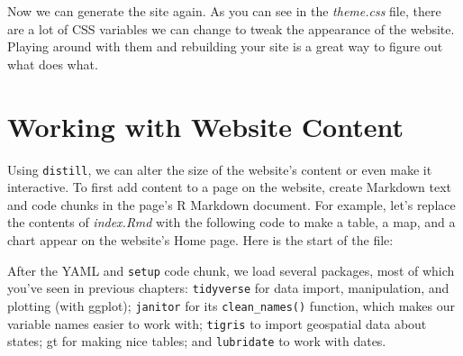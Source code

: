 \documentclass[
]{book}
\newenvironment{Shaded}{\begin{snugshade}}{\end{snugshade}}
\newcommand{\AnnotationTok}[1]{\textcolor[rgb]{0.56,0.35,0.01}{\textbf{\textit{#1}}}}
\newcommand{\CommentTok}[1]{\textcolor[rgb]{0.56,0.35,0.01}{\textit{#1}}}
\newcommand{\InformationTok}[1]{\textcolor[rgb]{0.56,0.35,0.01}{\textbf{\textit{#1}}}}
\begin{document}
Now we can generate the site again. As you can see in the \emph{theme.css} file, there are a lot of CSS variables we can change to tweak the appearance of the website. Playing around with them and rebuilding your site is a great way to figure out what does what.

\hypertarget{working-with-website-content}{%
\section*{Working with Website Content}\label{working-with-website-content}}

Using \texttt{distill}, we can alter the size of the website's content or even make it interactive. To first add content to a page on the website, create Markdown text and code chunks in the page's R Markdown document. For example, let's replace the contents of \emph{index.Rmd} with the following code to make a table, a map, and a chart appear on the website's Home page. Here is the start of the file:

\begin{Shaded}
\end{Shaded}

After the YAML and \texttt{setup} code chunk, we load several packages, most of which you've seen in previous chapters: \texttt{tidyverse} for data import, manipulation, and plotting (with ggplot); \texttt{janitor} for its \texttt{clean\_names()} function, which makes our variable names easier to work with; \texttt{tigris} to import geospatial data about states; gt for making nice tables; and \texttt{lubridate} to work with dates.
\end{document}
